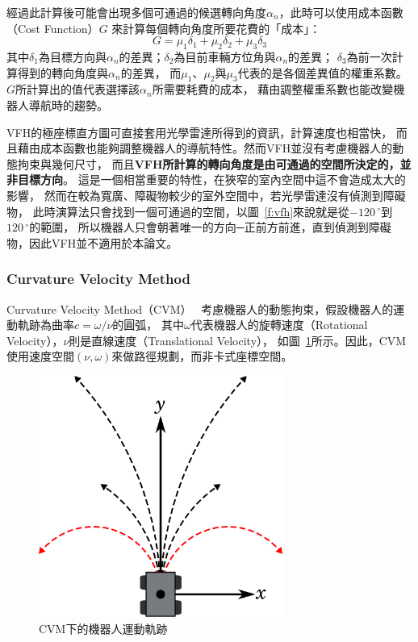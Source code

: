經過此計算後可能會出現多個可通過的候選轉向角度$\alpha_n$，此時可以使用成本函數（Cost Function）$G$
來計算每個轉向角度所要花費的「成本」：
\begin{equation}
	G = \mu_1 \delta_1 + \mu_2 \delta_2 + \mu_3 \delta_3
\end{equation}
其中$\delta_1$為目標方向與$\alpha_n$的差異；$\delta_2$為目前車輛方位角與$\alpha_n$的差異；
$\delta_3$為前一次計算得到的轉向角度與$\alpha_n$的差異，
而$\mu_1$、$\mu_2$與$\mu_3$代表的是各個差異值的權重系數。
$G$所計算出的值代表選擇該$\alpha_n$所需要耗費的成本，
藉由調整權重系數也能改變機器人導航時的趨勢。

VFH的極座標直方圖可直接套用光學雷達所得到的資訊，計算速度也相當快，
而且藉由成本函數也能夠調整機器人的導航特性。然而VFH並沒有考慮機器人的動態拘束與幾何尺寸，
而且\textbf{VFH所計算的轉向角度是由可通過的空間所決定的，並非目標方向}。
這是一個相當重要的特性，在狹窄的室內空間中這不會造成太大的影響，
然而在較為寬廣、障礙物較少的室外空間中，若光學雷達沒有偵測到障礙物，
此時演算法只會找到一個可通過的空間，以圖~\ref{f:vfh}來說就是從$-120\,^{\circ}$到$120\,^{\circ}$的範圍，
所以機器人只會朝著唯一的方向─正前方前進，直到偵測到障礙物，因此VFH並不適用於本論文。

\subsubsection{Curvature Velocity Method}
Curvature Velocity Method（CVM）~\cite{Simmons:1996:CVM}
考慮機器人的動態拘束，假設機器人的運動軌跡為曲率$c=\omega/\nu$的圓弧，
其中$\omega$代表機器人的旋轉速度（Rotational Velocity），$\nu$則是直線速度（Translational Velocity），
如圖~\ref{f:cvm_curvature}所示。因此，CVM使用速度空間$(\nu,\omega)$來做路徑規劃，而非卡式座標空間。
\begin{figure}
	\centering
	\includegraphics[width=8cm]{figures/algorithm/CVM1}
	\caption{CVM下的機器人運動軌跡}
	\label{f:cvm_curvature}
\end{figure}

